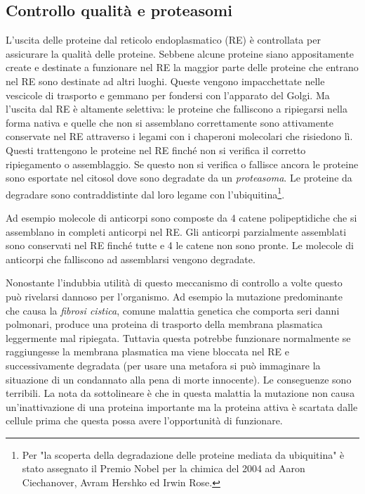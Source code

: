 {{}
\subsection{Controllo qualità e proteasomi}
{

L'uscita delle proteine dal reticolo endoplasmatico (RE) è controllata per assicurare la qualità delle proteine. Sebbene alcune proteine siano appositamente create e destinate a funzionare nel RE la maggior parte delle proteine che entrano nel RE sono destinate ad altri luoghi. Queste vengono impacchettate nelle vescicole di trasporto e gemmano per fondersi con l'apparato del Golgi. Ma l'uscita dal RE è altamente selettiva: le proteine che falliscono a ripiegarsi nella forma nativa e quelle che non si assemblano correttamente sono attivamente conservate nel RE attraverso i legami con i chaperoni molecolari che risiedono lì. Questi trattengono le proteine nel RE finché non si verifica il corretto ripiegamento o assemblaggio. Se questo non si verifica o fallisce ancora le proteine sono esportate nel citosol dove sono degradate da un \textit{proteasoma}. Le proteine da degradare sono contraddistinte dal loro legame con l'ubiquitina\footnote{Per "la scoperta della degradazione delle proteine mediata da ubiquitina" è stato assegnato il Premio Nobel per la chimica del 2004 ad Aaron Ciechanover, Avram Hershko ed Irwin Rose.}.

\par Ad esempio molecole di anticorpi sono composte da 4 catene polipeptidiche che si assemblano in completi anticorpi nel RE. Gli anticorpi parzialmente assemblati sono conservati nel RE finché tutte e 4 le catene non sono pronte. Le molecole di anticorpi che falliscono ad assemblarsi vengono degradate.

\par Nonostante l'indubbia utilità di questo meccanismo di controllo a volte questo può rivelarsi dannoso per l'organismo. Ad esempio la mutazione predominante che causa la \textit{fibrosi cistica}, comune malattia genetica che comporta seri danni polmonari, produce una proteina di trasporto della membrana plasmatica leggermente mal ripiegata. Tuttavia questa potrebbe funzionare normalmente se raggiungesse la membrana plasmatica ma viene bloccata nel RE e successivamente degradata\supercite{alberts2018essential} (per usare una metafora si può immaginare la situazione di un condannato alla pena di morte innocente). Le conseguenze sono terribili. La nota da sottolineare è che in questa malattia la mutazione non causa un'inattivazione di una proteina importante ma la proteina attiva è scartata dalle cellule prima che questa possa avere l'opportunità di funzionare. \\

}}
